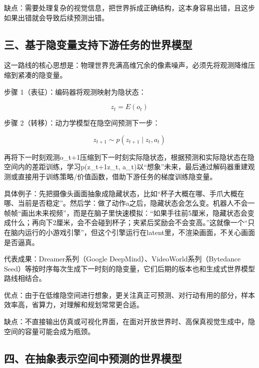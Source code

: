 缺点：需要处理复杂的视觉信息，把世界拆成正确结构，这本身容易出错，且这步如果出错就会导致后续预测出错。

\hypertarget{ux4e09ux57faux4e8eux9690ux53d8ux91cfux652fux6301ux4e0bux6e38ux4efbux52a1ux7684ux4e16ux754cux6a21ux578b}{%
\subsection{三、基于隐变量支持下游任务的世界模型}\label{ux4e09ux57faux4e8eux9690ux53d8ux91cfux652fux6301ux4e0bux6e38ux4efbux52a1ux7684ux4e16ux754cux6a21ux578b}}

这一路线的核心思想是：物理世界充满高维冗余的像素噪声，必须先将观测降维压缩到紧凑的隐变量。

步骤 1（表征）：编码器将观测映射为隐状态：

\[
z_t=E(o_t)
\]

步骤 2（转移）：动力学模型在隐空间预测下一步：

\[
z_{t+1}\sim p(z_{t+1}\mid z_t,a_t)
\]

再将下一时刻观测o\_t+1压缩到下一时刻实际隐状态，根据预测和实际隐状态在隐空间内的差距训练，学习p(z\_t+1\textbar z\_t, a\_t)以``想象''未来，最后通过解码器重建观测或直接用于训练策略/价值函数，借助下游任务的梯度训练隐变量。

具体例子：先把摄像头画面抽象成隐藏状态，比如``杯子大概在哪、手爪大概在哪、当前是否稳定''。然后学：做了动作a之后，隐藏状态会怎么变。机器人不会一帧帧``画出未来视频''，而是在脑子里快速模拟：``如果手往前5厘米，隐藏状态会变成什么；再向下2厘米，会不会碰到杯子；夹紧后奖励会不会变高。''这就像一个``只在脑内运行的小游戏引擎''，但这个引擎运行在latent里，不渲染画面，不关心画面是否逼真。

代表成果：Dreamer系列（Google DeepMind）、VideoWorld系列（Bytedance Seed）等按时序每次生成下一时刻的隐变量，它们后期的版本也和生成式世界模型路线相结合。

优点：由于在低维隐空间进行想象，更关注真正可预测、对行动有用的部分，样本效率高，省算力，对理解和规划常常更合适。

缺点：不直接输出仿真或可视化界面，在面对开放世界时、高保真视觉生成中，隐空间的容量可能会成为瓶颈。

\hypertarget{ux56dbux5728ux62bdux8c61ux8868ux793aux7a7aux95f4ux4e2dux9884ux6d4bux7684ux4e16ux754cux6a21ux578b}{%
\subsection{四、在抽象表示空间中预测的世界模型}\label{ux56dbux5728ux62bdux8c61ux8868ux793aux7a7aux95f4ux4e2dux9884ux6d4bux7684ux4e16ux754cux6a21ux578b}}

